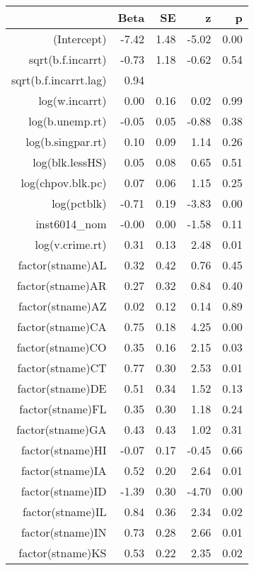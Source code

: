 \begin{table}[ht]
\centering
\begin{tabular}{rrrrr}
  \hline
 & Beta & SE & z & p \\ 
  \hline
(Intercept) & -7.42 & 1.48 & -5.02 & 0.00 \\ 
  sqrt(b.f.incarrt) & -0.73 & 1.18 & -0.62 & 0.54 \\ 
  sqrt(b.f.incarrt.lag) & 0.94 &  &  &  \\ 
  log(w.incarrt) & 0.00 & 0.16 & 0.02 & 0.99 \\ 
  log(b.unemp.rt) & -0.05 & 0.05 & -0.88 & 0.38 \\ 
  log(b.singpar.rt) & 0.10 & 0.09 & 1.14 & 0.26 \\ 
  log(blk.lessHS) & 0.05 & 0.08 & 0.65 & 0.51 \\ 
  log(chpov.blk.pc) & 0.07 & 0.06 & 1.15 & 0.25 \\ 
  log(pctblk) & -0.71 & 0.19 & -3.83 & 0.00 \\ 
  inst6014\_nom & -0.00 & 0.00 & -1.58 & 0.11 \\ 
  log(v.crime.rt) & 0.31 & 0.13 & 2.48 & 0.01 \\ 
  factor(stname)AL & 0.32 & 0.42 & 0.76 & 0.45 \\ 
  factor(stname)AR & 0.27 & 0.32 & 0.84 & 0.40 \\ 
  factor(stname)AZ & 0.02 & 0.12 & 0.14 & 0.89 \\ 
  factor(stname)CA & 0.75 & 0.18 & 4.25 & 0.00 \\ 
  factor(stname)CO & 0.35 & 0.16 & 2.15 & 0.03 \\ 
  factor(stname)CT & 0.77 & 0.30 & 2.53 & 0.01 \\ 
  factor(stname)DE & 0.51 & 0.34 & 1.52 & 0.13 \\ 
  factor(stname)FL & 0.35 & 0.30 & 1.18 & 0.24 \\ 
  factor(stname)GA & 0.43 & 0.43 & 1.02 & 0.31 \\ 
  factor(stname)HI & -0.07 & 0.17 & -0.45 & 0.66 \\ 
  factor(stname)IA & 0.52 & 0.20 & 2.64 & 0.01 \\ 
  factor(stname)ID & -1.39 & 0.30 & -4.70 & 0.00 \\ 
  factor(stname)IL & 0.84 & 0.36 & 2.34 & 0.02 \\ 
  factor(stname)IN & 0.73 & 0.28 & 2.66 & 0.01 \\ 
  factor(stname)KS & 0.53 & 0.22 & 2.35 & 0.02 \\ 

\end{tabular}
\end{table}
